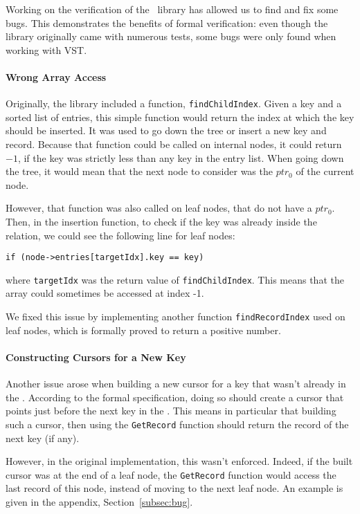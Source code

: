 Working on the verification of the \btrees\ library has allowed us to find and fix some bugs.
This demonstrates the benefits of formal verification: even though the library originally came with numerous tests, some bugs were only found when working with VST.

\paragraph{Wrong Array Access} Originally, the library included a function, \lstinline{findChildIndex}.
Given a key and a sorted list of entries, this simple function would return the index at which the key should be inserted.
It was used to go down the tree or insert a new key and record.
Because that function could be called on internal nodes, it could return $-1$, if the key was strictly less than any key in the entry list.
When going down the tree, it would mean that the next node to consider was the $ptr_0$ of the current node.

However, that function was also called on leaf nodes, that do not have a $ptr_0$.
Then, in the insertion function, to check if the key was already inside the relation, we could see the following line for leaf nodes:
\begin{lstlisting}
if (node->entries[targetIdx].key == key)
\end{lstlisting}
where \lstinline{targetIdx} was the return value of \lstinline{findChildIndex}.
This means that the array could sometimes be accessed at index -1.

We fixed this issue by implementing another function \lstinline{findRecordIndex} used on leaf nodes, which is formally proved to return a positive number.

\paragraph{Constructing Cursors for a New Key}
Another issue arose when building a new cursor for a key that wasn't already in the \btree.
According to the formal specification, doing so should create a cursor that points just before the next key in the \btree.
This means in particular that building such a cursor, then using the \lstinline{GetRecord} function should return the record of the next key (if any).

However, in the original implementation, this wasn't enforced.
Indeed, if the built cursor was at the end of a leaf node, the \lstinline{GetRecord} function would access the last record of this node, instead of moving to the next leaf node.
An example is given in the appendix, Section~\ref{subsec:bug}.

